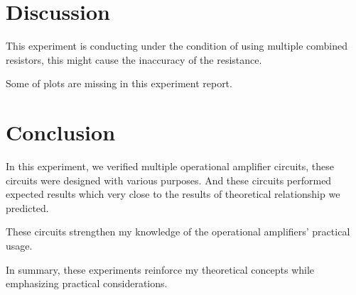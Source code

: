 \section{Discussion}
This experiment is conducting under the condition of using multiple combined resistors, this might cause the inaccuracy of the resistance.\par
Some of plots are missing in this experiment report. 

\section{Conclusion}
In this experiment, we verified multiple operational amplifier circuits, these circuits were designed with various purposes. And these circuits performed expected results which very close to the results of theoretical relationship we predicted.\par
These circuits strengthen my knowledge of the operational amplifiers' practical usage.\par
In summary, these experiments reinforce my theoretical concepts while emphasizing practical considerations.